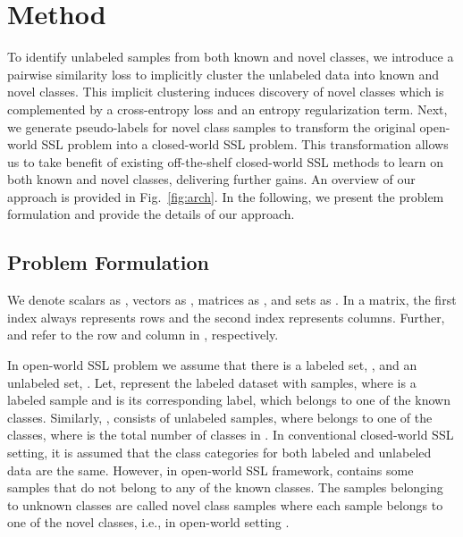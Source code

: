 \documentclass[runningheads]{eccv2022submission}
\begin{document}
\vspace{-2mm}
\section{Method}
\vspace{-2mm}
\label{sec:method}

To identify unlabeled samples from both known and novel classes, we introduce a pairwise similarity loss to implicitly cluster the unlabeled data into known and novel classes. This implicit clustering induces discovery of novel classes which is complemented by a cross-entropy loss and an entropy regularization term. Next, we generate pseudo-labels for novel class samples to transform the original open-world SSL problem into a closed-world SSL problem. This transformation allows us to take benefit of existing off-the-shelf closed-world SSL methods to learn on both known and novel classes, delivering further gains. 
An overview of our approach is provided in Fig.~\ref{fig:arch}. In the following, we present the problem formulation and provide the details of our approach.


\subsection{Problem Formulation}
\vspace{-2mm}
We denote scalars as , vectors as , matrices as , and sets as . In a matrix, the first index always represents rows and the second index represents columns. Further,  and  refer to the  row and   column in , respectively.

In open-world SSL problem we assume that there is a labeled set, , and an unlabeled set, . Let,  represent the labeled dataset with  samples, where  is a labeled sample and  is its corresponding label, which belongs to one of the  known classes. Similarly, , consists of  unlabeled samples, where  belongs to one of the  classes, where  is the total number of classes in . In conventional closed-world SSL setting, it is assumed that the class categories for both labeled and unlabeled data are the same. However, in open-world SSL framework,  contains some samples that do not belong to any of the known classes. The samples belonging to unknown classes are called novel class samples where each sample belongs to one of the  novel classes, i.e., in open-world setting .  
\end{document}
